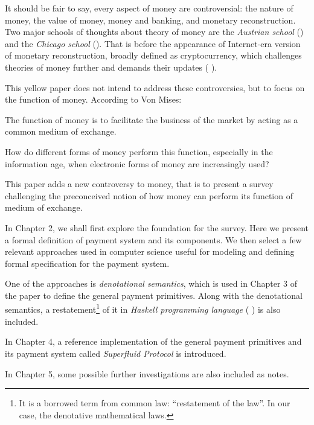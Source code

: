 It should be fair to say, every aspect of money are controversial: the nature of money, the value of
money, money and banking, and monetary reconstruction. Two major schools of thoughts about theory of
money are the \textit{Austrian school} (\cite{von2013theory}) and the \textit{Chicago school}
(\cite{friedman1989quantity}). That is before the appearance of Internet-era version of monetary
reconstruction, broadly defined as cryptocurrency, which challenges theories of money further and
demands their updates (\cite{ammous2018can} \cite{hardle2020understanding}).

This yellow paper does not intend to address these controversies, but to focus on the function of
money. According to Von Mises:

\begin{displayquote}
The function of money is to facilitate the business of the market by acting as a common medium of
exchange. 
\end{displayquote}

How do different forms of money perform this function, especially in the information age, when
electronic forms of money are increasingly used?

This paper adds a new controversy to money, that is to present a survey challenging the preconceived
notion of how money can perform its function of medium of exchange.

In Chapter 2, we shall first explore the foundation for the survey. Here we present a formal
definition of payment system and its components. We then select a few relevant approaches used in
computer science useful for modeling and defining formal specification for the payment system.

One of the approaches is \textit{denotational semantics}, which is used in Chapter 3 of the paper to
define the general payment primitives. Along with the denotational semantics, a
restatement\footnote{It is a borrowed term from common law: ``restatement of the law''. In our case,
the denotative mathematical laws.} of it in \textit{Haskell programming language}
(\cite{hudak1992report} \cite{jones2003haskell} \cite{marlow2010haskell}) is also included.

In Chapter 4, a reference implementation of the general payment primitives and its payment system
called \textit{Superfluid Protocol} is introduced.

In Chapter 5, some possible further investigations are also included as notes.

